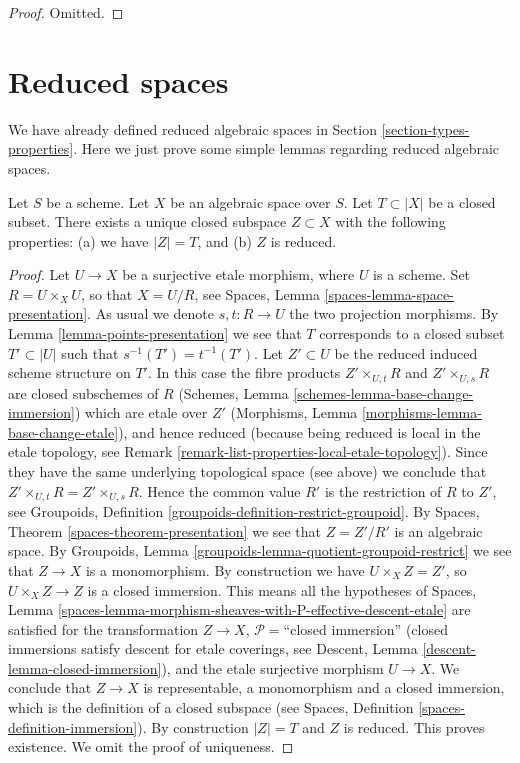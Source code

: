 \begin{proof}
Omitted.
\end{proof}






\section{Reduced spaces}
\label{section-reduced}

\noindent
We have already defined reduced algebraic spaces in
Section \ref{section-types-properties}.
Here we just prove some simple lemmas regarding reduced algebraic
spaces.

\begin{lemma}
\label{lemma-reduced-closed-subspace}
Let $S$ be a scheme.
Let $X$ be an algebraic space over $S$.
Let $T \subset |X|$ be a closed subset.
There exists a unique closed subspace $Z \subset X$ with
the following properties: (a) we have $|Z| = T$, and (b) $Z$ is reduced.
\end{lemma}

\begin{proof}
Let $U \to X$ be a surjective etale morphism, where $U$ is a scheme.
Set $R = U \times_X U$, so that $X = U/R$, see
Spaces, Lemma \ref{spaces-lemma-space-presentation}.
As usual we denote $s, t : R \to U$ the two projection morphisms.
By Lemma \ref{lemma-points-presentation}
we see that $T$ corresponds to a closed subset $T' \subset |U|$ such
that $s^{-1}(T') = t^{-1}(T')$.
Let $Z' \subset U$ be the reduced induced scheme structure on $T'$.
In this case the fibre products
$Z' \times_{U, t} R$ and $Z' \times_{U, s} R$ are closed subschemes
of $R$
(Schemes, Lemma \ref{schemes-lemma-base-change-immersion})
which are etale over $Z'$
(Morphisms, Lemma \ref{morphisms-lemma-base-change-etale}),
and hence reduced
(because being reduced is local in the etale topology, see
Remark \ref{remark-list-properties-local-etale-topology}).
Since they have the same underlying topological space (see above)
we conclude that $Z' \times_{U, t} R = Z' \times_{U, s} R$.
Hence the common value $R'$ is the restriction of $R$ to $Z'$, see
Groupoids, Definition \ref{groupoids-definition-restrict-groupoid}. By
Spaces, Theorem \ref{spaces-theorem-presentation} we see that
$Z = Z'/R'$ is an algebraic space. By
Groupoids, Lemma \ref{groupoids-lemma-quotient-groupoid-restrict}
we see that $Z \to X$ is a monomorphism. By construction we have
$U \times_X Z = Z'$, so $U \times_X Z \to Z$ is a closed immersion.
This means all the hypotheses of
Spaces,
Lemma \ref{spaces-lemma-morphism-sheaves-with-P-effective-descent-etale}
are satisfied
for the transformation $Z \to X$, $\mathcal{P}=$``closed immersion'' (closed
immersions satisfy descent for etale coverings, see
Descent, Lemma \ref{descent-lemma-closed-immersion}),
and the etale surjective morphism $U \to X$. We conclude that $Z \to X$
is representable, a monomorphism and a closed immersion, which is the
definition of a closed subspace (see
Spaces, Definition \ref{spaces-definition-immersion}). By construction
$|Z| = T$ and $Z$ is reduced. This proves existence. We omit the proof
of uniqueness.
\end{proof}

